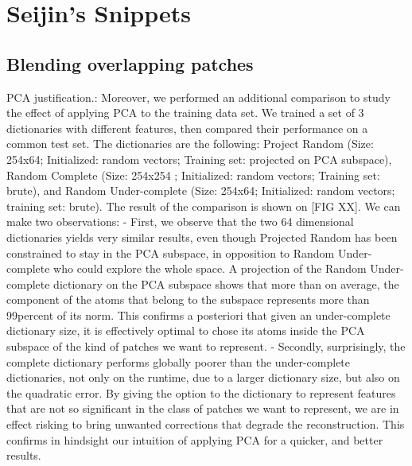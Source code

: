 \section*{Seijin's Snippets}

\subsection{Blending overlapping patches}


PCA justification.:
Moreover, we performed an additional comparison to study the effect of applying PCA to the training data set. We trained a set of 3 dictionaries with different features, then compared their performance on a common test set. The dictionaries are the following:  Project Random (Size: 254x64; Initialized: random vectors; Training set: projected on PCA subspace), Random Complete (Size: 254x254 ; Initialized: random vectors; Training set: brute), and Random Under-complete (Size: 254x64; Initialized: random vectors; training set: brute).
The result of the comparison is shown on [FIG XX]. 
We can make two observations:
- First, we observe that the two 64 dimensional dictionaries yields very similar results, even though Projected Random has been constrained to stay in the PCA subspace, in opposition to Random Under-complete who could explore the whole space. A projection of the Random Under-complete dictionary on the PCA subspace shows that more than on average, the component of the atoms that belong to the subspace represents more than 99percent of its norm. This confirms a posteriori that given an under-complete dictionary size, it is effectively optimal to chose its atoms inside the PCA subspace of the kind of patches we want to represent.
- Secondly, surprisingly, the complete dictionary performs globally poorer than the under-complete dictionaries, not only on the runtime, due to a larger dictionary size, but also on the quadratic error. By giving the option to the dictionary to represent features that are not so significant in the class of patches we want to represent, we are in effect risking to bring unwanted corrections that degrade the reconstruction. 
This confirms in hindsight our intuition of applying PCA for a quicker, and better results.











